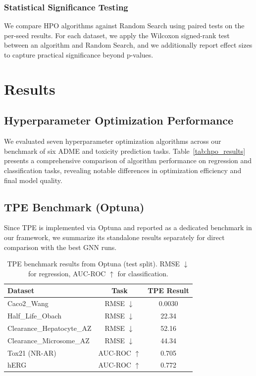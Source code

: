 \documentclass[12pt]{article}
\begin{document}
\subsubsection{Statistical Significance Testing}
We compare HPO algorithms against Random Search using paired tests on the per-seed results. For each dataset, we apply the Wilcoxon signed-rank test between an algorithm and Random Search, and we additionally report effect sizes to capture practical significance beyond p-values.


\section{Results}
\label{results}
\subsection{Hyperparameter Optimization Performance}
\label{sec:hpo_performance}

We evaluated seven hyperparameter optimization algorithms across our benchmark of six ADME and toxicity prediction tasks. Table~\ref{tab:hpo_results} presents a comprehensive comparison of algorithm performance on regression and classification tasks, revealing notable differences in optimization efficiency and final model quality.
\subsection{TPE Benchmark (Optuna)}
\label{sec:tpe_benchmark}

Since TPE is implemented via Optuna and reported as a dedicated benchmark in our framework,
we summarize its standalone results separately for direct comparison with the best GNN runs.

\begin{table}[htbp]
\centering
\caption{TPE benchmark results from Optuna (test split). RMSE $\downarrow$ for regression, AUC-ROC $\uparrow$ for classification.}
\label{tab:tpe_results}
\small
\begin{tabular}{lcc}
\toprule
\textbf{Dataset} & \textbf{Task} & \textbf{TPE Result} \\
\midrule
Caco2\_Wang & RMSE $\downarrow$ & 0.0030 \\
Half\_Life\_Obach & RMSE $\downarrow$ & 22.34 \\
Clearance\_Hepatocyte\_AZ & RMSE $\downarrow$ & 52.16 \\
Clearance\_Microsome\_AZ & RMSE $\downarrow$ & 44.34 \\
Tox21 (NR-AR) & AUC-ROC $\uparrow$ & 0.705 \\
hERG & AUC-ROC $\uparrow$ & 0.772 \\
\bottomrule
\end{tabular}
\end{table}
\end{document}
